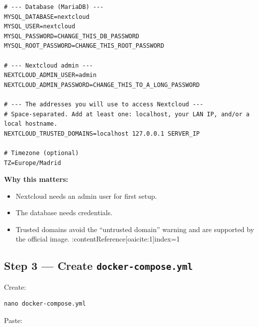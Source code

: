\begin{lstlisting}
# --- Database (MariaDB) ---
MYSQL_DATABASE=nextcloud
MYSQL_USER=nextcloud
MYSQL_PASSWORD=CHANGE_THIS_DB_PASSWORD
MYSQL_ROOT_PASSWORD=CHANGE_THIS_ROOT_PASSWORD

# --- Nextcloud admin ---
NEXTCLOUD_ADMIN_USER=admin
NEXTCLOUD_ADMIN_PASSWORD=CHANGE_THIS_TO_A_LONG_PASSWORD

# --- The addresses you will use to access Nextcloud ---
# Space-separated. Add at least one: localhost, your LAN IP, and/or a local hostname.
NEXTCLOUD_TRUSTED_DOMAINS=localhost 127.0.0.1 SERVER_IP

# Timezone (optional)
TZ=Europe/Madrid
\end{lstlisting}

\textbf{Why this matters:}
\begin{itemize}[leftmargin=*]
  \item Nextcloud needs an admin user for first setup.
  \item The database needs credentials.
  \item Trusted domains avoid the ``untrusted domain'' warning and are supported by the official image. :contentReference[oaicite:1]{index=1}
\end{itemize}


\subsection{Step 3 --- Create \texttt{docker-compose.yml}}
Create:

\begin{lstlisting}
nano docker-compose.yml
\end{lstlisting}

Paste:

